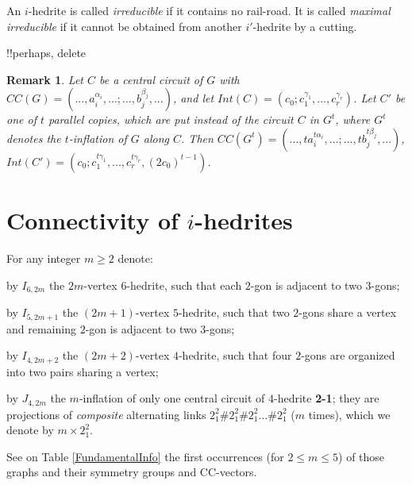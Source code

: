 \documentclass[12pt]{article}
\newtheorem{remark}{Remark}
\begin{document}

An $i$-hedrite is called {\em irreducible} if it contains no 
rail-road. It is called {\em maximal irreducible} if it cannot be
obtained from another $i'$-hedrite by a cutting.

!!perhaps, delete %

\begin{remark}

Let $C$ be a central circuit of $G$ with $CC(G)=(...,a_i^{\alpha_i},...;...,b_j^{\beta_j},...)$,  and let 
$Int(C)=(c_0;c_1^{\gamma_1},...,c_r^{\gamma_r})$. Let $C'$ be one of 
$t$ parallel copies, which are put instead of the circuit $C$ in 
$G^t$, where $G^t$ denotes the $t$-inflation of $G$ along $C$.
Then $CC(G^t)=(...,ta_i^{t\alpha_i},...;...,tb_j^{t\beta_j},...)$,
$Int(C')=(c_0;c_1^{t\gamma_1},...,c_r^{t\gamma_r}, (2c_0)^{t-1})$.
\end{remark}


\section{Connectivity of $i$-hedrites}
For any integer $m\geq 2$ denote:

by $I_{6,2m}$ the $2m$-vertex $6$-hedrite, such that each $2$-gon is adjacent to two $3$-gons;

by $I_{5,2m+1}$ the $(2m+1)$-vertex $5$-hedrite, such that 
two $2$-gons share a vertex and remaining $2$-gon is adjacent
to two $3$-gons;

by $I_{4,2m+2}$ the $(2m+2)$-vertex $4$-hedrite, such that 
four $2$-gons are organized into two pairs sharing a vertex; 

by $J_{4,2m}$ the $m$-inflation of only one central circuit of
$4$-hedrite {\bf 2-1}; they are projections of {\em composite}
alternating links $2^2_1\#2^2_1\#2^2_1\dots\#2^2_1$ ($m$ times),
which we denote by $m\times 2^2_1$.

See on Table \ref{FundamentalInfo} the first occurrences 
(for $2\leq m\leq 5$) of those graphs and their symmetry 
groups and CC-vectors.
\end{document}
